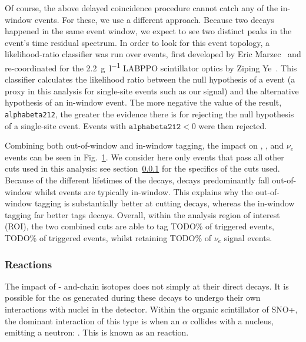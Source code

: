 Of course, the above delayed coincidence procedure cannot catch any of the in-window  events. For these, we use a different approach. Because two decays happened in the same event window, we expect to see two distinct peaks in the event's time residual spectrum. In order to look for this event topology, a likelihood-ratio classifier was run over events, first developed by Eric Marzec~\cite{} %
and re-coordinated for the \SI{2.2}{\gram\per\litre} LABPPO scintillator optics by Ziping Ye~\cite{}. %
This classifier calculates the likelihood ratio between the null hypothesis of a \onbb{} event (a proxy in this analysis for single-site events such as our \beight{} signal) and the alternative hypothesis of an in-window  event. The more negative the value of the result, \texttt{alphabeta212}, the greater the evidence there is for rejecting the null hypothesis of a single-site event. Events with $\texttt{alphabeta212} < 0$ %
were then rejected.

Combining both out-of-window and in-window  tagging, the impact on , , and \beight{} $\nu_e$ events can be seen in Fig.~\ref{fig:bipo_tagging_efficiency}. We consider here only events that pass all other cuts used in this analysis: see section~\ref{} %
for the specifics of the cuts used. Because of the different lifetimes of the decays,  decays predominantly fall out-of-window whilst  events are typically in-window. This explains why the out-of-window tagging is substantially better at cutting  decays, whereas the in-window tagging far better tags  decays. Overall, within the analysis region of interest (ROI), the two combined cuts are able to tag TODO\% %
of  triggered events, TODO\% %
of  triggered events, whilst retaining TODO\% %
of \beight{} $\nu_e$ signal events.

\begin{figure}
    \centering
    \caption[]{}
    \label{fig:bipo_tagging_efficiency}
\end{figure}

\subsubsection{\alphan{} Reactions}
The impact of - and-chain isotopes does not simply at their direct decays. It is possible for the $\alpha$s generated during these decays to undergo their own interactions with nuclei in the detector. Within the organic scintillator of SNO+, the dominant interaction of this type is when an $\alpha$ collides with a  nucleus, emitting a neutron: . This is known as an \alphan{} reaction.


